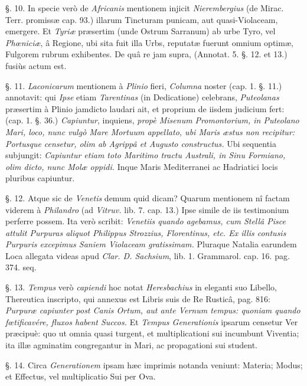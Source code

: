 \documentclass[a4paper, 11pt, oneside, polutonikogreek, german]{article}
\begin{document}
§. 10. In specie verò de \emph{Africanis} mentionem injicit \emph{Nierembergius} (de Mirac. Terr. promissæ cap. 93.) illarum Tincturam punicam, aut quasi-Violaceam, emergere. Et \emph{Tyriæ} præsertim (unde Ostrum Sarranum) ab urbe Tyro, vel \emph{Phœniciæ}, â Regione, ubi sita fuit illa Urbs, reputatæ fuerunt omnium optimæ, Fulgorem rubrum exhibentes. De quâ re jam supra, (Annotat. 5. §. 12. et 13.) fusiùs actum est.

§. 11. \emph{Laconicarum} mentionem à \emph{Plinio} fieri, \emph{Columna} noster (cap. 1. §. 11.) annotavit: qui \emph{Ipse} etiam \emph{Tarentinas} (in Dedicatione) celebrans, \emph{Puteolanas} præsertim à Plinio jamdicto laudari ait, et proprium de iisdem judicium fert: (cap. 1. §. 36.) \emph{Capiuntur}, inquiens, \emph{propè Misenum Promontorium, in Puteolano Mari, loco, nunc vulgò Mare Mortuum appellato, ubi Maris æstus non recipitur: Portusque censetur, olim ab Agrippâ et Augusto constructus.} Ubi sequentia subjungit: \emph{Capiuntur etiam toto Maritimo tractu Australi, in Sinu Formiano, olim dicto, nunc Molæ oppidi.} Inque Maris Mediterranei ac Hadriatici locis pluribus capiuntur.

§. 12. Atque sic de \emph{Venetis} demum quid dicam? Quarum mentionem nî factam viderem à \emph{Philandro} (ad \emph{Vitruv.} lib. 7. cap. 13.) Ipse simile de iis testimonium perferre possem. Ita verò scribit: \emph{Venetiis quando agebamus, cum Stellâ Pisce attulit Purpuras aliquot Philippus Strozzius, Florentinus, etc. Ex illis contusis Purpuris excepimus Saniem Violaceam gratissimam.} Pluraque Natalia earundem Loca allegata videas apud \emph{Clar. D. Sachsium}, lib. 1. Grammarol. cap. 16. pag. 374. seq.

§. 13. \emph{Tempus} verò \emph{capiendi} hoc notat \emph{Heresbachius} in eleganti suo Libello, Thereutica inscripto, qui annexus est Libris suis de Re Rusticâ, pag. 816: \emph{Purpuræ capiunter post Canis Ortum, aut ante Vernum tempus: quoniam quando fœtificavére, fluxos habent Succos.} Et \emph{Tempus Generationis} ipsarum censetur Ver præcipuè: quo ut omnia quasi turgent, et multiplicationi sui incumbunt Viventia; ita illæ agminatim congregantur in Mari, ac propagationi sui student.

§. 14. Circa \emph{Generationem} ipsam hæc imprimis notanda veniunt: Materia; Modus; et Effectus, vel multiplicatio Sui per Ova.
\end{document}
